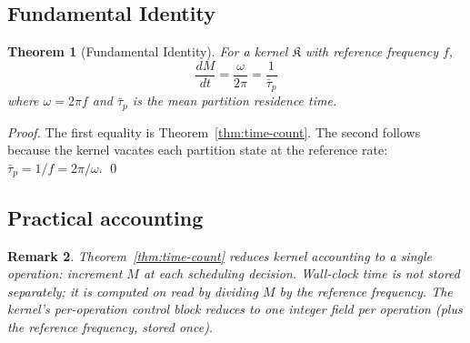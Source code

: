 \documentclass[twocolumn,11pt,a4paper]{article}
\newtheorem{theorem}{Theorem}[section]
\newtheorem{remark}[theorem]{Remark}
\newcommand{\Kernel}{\mathfrak{K}}
\newcommand{\Mcount}{M}
\begin{document}
\subsection{Fundamental Identity}

\begin{theorem}[Fundamental Identity]
\label{thm:fundamental}
For a kernel $\Kernel$ with reference frequency $f$,
\[
\frac{d\Mcount}{dt} = \frac{\omega}{2\pi} = \frac{1}{\bar{\tau}_p}
\]
where $\omega = 2\pi f$ and $\bar{\tau}_p$ is the mean partition residence time.
\end{theorem}

\begin{proof}
The first equality is Theorem~\ref{thm:time-count}. The second follows because the kernel vacates each partition state at the reference rate: $\bar{\tau}_p = 1/f = 2\pi/\omega$. \qed
\end{proof}

\subsection{Practical accounting}

\begin{remark}
\label{rem:accounting}
Theorem~\ref{thm:time-count} reduces kernel accounting to a single operation: increment $\Mcount$ at each scheduling decision. Wall-clock time is not stored separately; it is computed on read by dividing $\Mcount$ by the reference frequency. The kernel's per-operation control block reduces to one integer field per operation (plus the reference frequency, stored once).
\end{remark}
\end{document}
